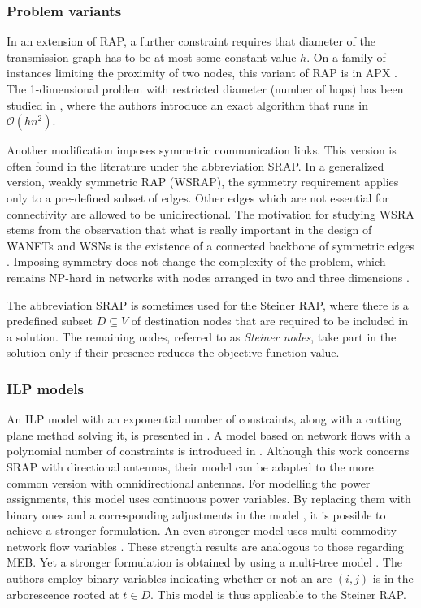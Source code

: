\subsubsection{Problem variants}

In an extension of RAP, a further constraint requires that diameter of the transmission graph has to be at most some constant value $h$.
On a family of instances limiting the proximity of two nodes, this variant of RAP is in APX \cite{clementi01b}.
The 1-dimensional problem with restricted diameter (number of hops) has been studied in \cite{clementi03}, where the authors introduce an exact algorithm that runs in $\mathcal{O}(hn^2)$.

Another modification imposes symmetric communication links.
This version is often found in the literature under the abbreviation SRAP.
In a generalized version, weakly symmetric RAP (WSRAP), the symmetry requirement applies only to a pre-defined subset of edges.
Other edges which are not essential for connectivity are allowed to be unidirectional.
The motivation for studying WSRA stems from the observation that what is really important in the design of WANETs and WSNs is the existence of a connected backbone of symmetric edges \cite{santi05}.
Imposing symmetry does not change the complexity of the problem, which remains NP-hard in networks with nodes arranged in two and three dimensions \cite{blough02}.

The abbreviation SRAP is sometimes used for the Steiner RAP, where there is a predefined subset $D\subseteq V$ of destination nodes that are required to be included in a solution.
The remaining nodes, referred to as \emph{Steiner nodes},  take part in the solution only if their presence reduces the objective function value.

\subsubsection{ILP models}

An ILP model with an exponential number of constraints, along with a cutting plane method solving it, is presented in \cite{althaus03}.
A model based on network flows with a polynomial number of constraints is introduced in \cite{das04}.
Although this work concerns SRAP with directional antennas, their model can be adapted to the more common version with omnidirectional antennas.
For modelling the power assignments, this model uses continuous power variables.
By replacing them with binary ones and a corresponding adjustments in the model \cite{montemanni05, haugland11}, it is possible to achieve a stronger formulation.
An even stronger model uses multi-commodity network flow variables \cite{haugland11}. 
These strength results are analogous to those regarding MEB.
Yet a stronger formulation is obtained by using a multi-tree model \cite{haugland11}. 
The authors employ binary variables indicating whether or not an arc $(i,j)$ is in the arborescence rooted at $t\in D$.
This model is thus applicable to the Steiner RAP.

